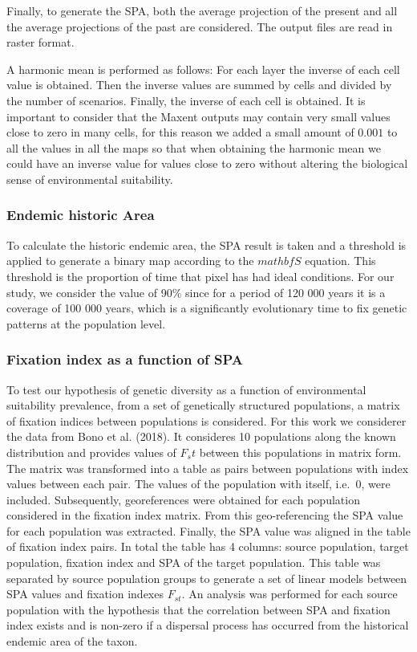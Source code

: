 \documentclass[
]{article}
\begin{document}
Finally, to generate the SPA, both the average projection of the present
and all the average projections of the past are considered. The output
files are read in raster format.

A harmonic mean is performed as follows: For each layer the inverse of
each cell value is obtained. Then the inverse values are summed by cells
and divided by the number of scenarios. Finally, the inverse of each
cell is obtained. It is important to consider that the Maxent outputs
may contain very small values close to zero in many cells, for this
reason we added a small amount of \(0.001\) to all the values in all the
maps so that when obtaining the harmonic mean we could have an inverse
value for values close to zero without altering the biological sense of
environmental suitability.

\hypertarget{endemic-historic-area}{%
\subsubsection{Endemic historic Area}\label{endemic-historic-area}}

To calculate the historic endemic area, the SPA result is taken and a
threshold is applied to generate a binary map according to the
\(mathbf{S}\) equation. This threshold is the proportion of time that
pixel has had ideal conditions. For our study, we consider the value of
90\% since for a period of 120 000 years it is a coverage of 100 000
years, which is a significantly evolutionary time to fix genetic
patterns at the population level.

\hypertarget{fixation-index-as-a-function-of-spa}{%
\subsubsection{Fixation index as a function of
SPA}\label{fixation-index-as-a-function-of-spa}}

To test our hypothesis of genetic diversity as a function of
environmental suitability prevalence, from a set of genetically
structured populations, a matrix of fixation indices between populations
is considered. For this work we considerer the data from Bono et al.
(2018). It consideres 10 populations along the known distribution and
provides values of \(F_st\) between this populations in matrix form. The
matrix was transformed into a table as pairs between populations with
index values between each pair. The values of the population with
itself, i.e.~\(0\), were included. Subsequently, georeferences were
obtained for each population considered in the fixation index matrix.
From this geo-referencing the SPA value for each population was
extracted. Finally, the SPA value was aligned in the table of fixation
index pairs. In total the table has 4 columns: source population, target
population, fixation index and SPA of the target population. This table
was separated by source population groups to generate a set of linear
models between SPA values and fixation indexes \(F_{st}\). An analysis
was performed for each source population with the hypothesis that the
correlation between SPA and fixation index exists and is non-zero if a
dispersal process has occurred from the historical endemic area of the
taxon.
\end{document}
